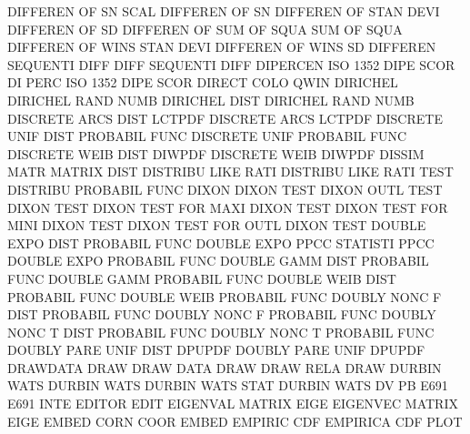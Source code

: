 DIFFEREN OF   SN   SCAL                 DIFFEREN OF   SN
DIFFEREN OF   STAN DEVI                 DIFFEREN OF   SD
DIFFEREN OF   SUM  OF   SQUA            SUM      OF   SQUA
DIFFEREN OF   WINS STAN DEVI            DIFFEREN OF   WINS SD
DIFFEREN                                SEQUENTI DIFF
DIFF                                    SEQUENTI DIFF
DIPERCEN                                ISO      1352 DIPE SCOR
DI       PERC                           ISO      1352 DIPE SCOR
DIRECT   COLO                           QWIN
DIRICHEL                                DIRICHEL RAND NUMB
DIRICHEL DIST                           DIRICHEL RAND NUMB
DISCRETE ARCS DIST                      LCTPDF
DISCRETE ARCS                           LCTPDF
DISCRETE UNIF DIST                      PROBABIL FUNC
DISCRETE UNIF                           PROBABIL FUNC
DISCRETE WEIB DIST                      DIWPDF
DISCRETE WEIB                           DIWPDF
DISSIM   MATR                           MATRIX   DIST
DISTRIBU LIKE RATI                      DISTRIBU LIKE RATI TEST
DISTRIBU                                PROBABIL FUNC
DIXON                                   DIXON    TEST
DIXON    OUTL TEST                      DIXON    TEST
DIXON    TEST FOR  MAXI                 DIXON    TEST
DIXON    TEST FOR  MINI                 DIXON    TEST
DIXON    TEST FOR  OUTL                 DIXON    TEST
DOUBLE   EXPO DIST                      PROBABIL FUNC
DOUBLE   EXPO PPCC                      STATISTI PPCC
DOUBLE   EXPO                           PROBABIL FUNC
DOUBLE   GAMM DIST                      PROBABIL FUNC
DOUBLE   GAMM                           PROBABIL FUNC
DOUBLE   WEIB DIST                      PROBABIL FUNC
DOUBLE   WEIB                           PROBABIL FUNC
DOUBLY   NONC F    DIST                 PROBABIL FUNC
DOUBLY   NONC F                         PROBABIL FUNC
DOUBLY   NONC T    DIST                 PROBABIL FUNC
DOUBLY   NONC T                         PROBABIL FUNC
DOUBLY   PARE UNIF DIST                 DPUPDF
DOUBLY   PARE UNIF                      DPUPDF
DRAWDATA                                DRAW
DRAW     DATA                           DRAW
DRAW     RELA                           DRAW
DURBIN   WATS                           DURBIN   WATS
DURBIN   WATS STAT                      DURBIN   WATS
DV                                      PB
E691                                    E691     INTE
EDITOR                                  EDIT
EIGENVAL                                MATRIX   EIGE
EIGENVEC                                MATRIX   EIGE
EMBED    CORN COOR                      EMBED
EMPIRIC  CDF                            EMPIRICA CDF  PLOT
